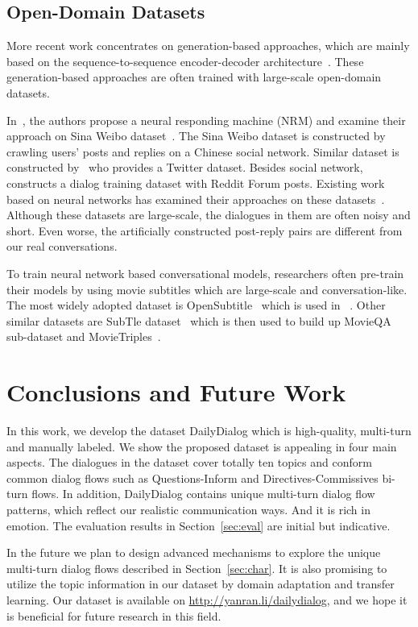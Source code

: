 \documentclass[11pt,letterpaper]{article}
\begin{document}
\subsection{Open-Domain Datasets}
More recent work concentrates on generation-based approaches, which are mainly based on the sequence-to-sequence encoder-decoder architecture~\cite{hred,vhred}. These generation-based approaches are often trained with large-scale open-domain datasets. 

In~\citet{Shang2015NeuralRM}, the authors propose a neural responding machine (NRM) and examine their approach on Sina Weibo dataset~\cite{weibo}. The Sina Weibo dataset is constructed by crawling users' posts and replies on a Chinese social network. Similar dataset is constructed by~\citet{twitter} who provides a Twitter dataset. Besides social network,~\citet{reddit} constructs a dialog training dataset with Reddit Forum posts. Existing work based on neural networks has examined their approaches on these datasets~\cite{ECM,weibo,hred,vhred}. Although these datasets are large-scale, the dialogues in them are often noisy and short. Even worse, the artificially constructed post-reply pairs are different from our real conversations. 

To train neural network based conversational models, researchers often pre-train their models by using movie subtitles which are large-scale and conversation-like. The most widely adopted dataset is OpenSubtitle~\cite{opensubtitles} which is used in ~\citet{Li2016DeepRL,li2017adversarial}. Other similar datasets are SubTle dataset~\cite{babi} which is then used to build up MovieQA sub-dataset and MovieTriples~\cite{movietriples}.

\section{Conclusions and Future Work}

In this work, we develop the dataset DailyDialog which is high-quality, multi-turn and manually labeled. We show the proposed dataset is appealing in four main aspects. The dialogues in the dataset cover totally ten topics and conform common dialog flows such as Questions-Inform and Directives-Commissives bi-turn flows. In addition, DailyDialog contains unique multi-turn dialog flow patterns, which reflect our realistic communication ways. And it is rich in emotion. The evaluation results in Section~\ref{sec:eval} are initial but indicative. 

In the future we plan to design advanced mechanisms to explore the unique multi-turn dialog flows described in Section~\ref{sec:char}. It is also promising to utilize the topic information in our dataset by domain adaptation and transfer learning. Our dataset is available on {\url{http://yanran.li/dailydialog}}, and we hope it is beneficial for future research in this field. 
\end{document}
